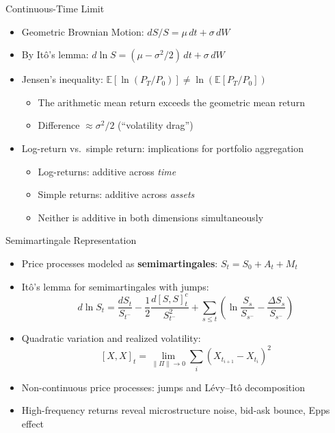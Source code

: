 \documentclass[9pt, aspectratio=169, t]{beamer}
\theoremstyle{definition}
\newcommand{\E}{\mathbb{E}}
\begin{document}
\begin{frame}{Continuous-Time Limit}
\begin{itemize}
\item Geometric Brownian Motion: $dS/S = \mu\,dt + \sigma\,dW$
\item By It\^{o}'s lemma: $d\ln S = (\mu - \sigma^2/2)\,dt + \sigma\,dW$
\item Jensen's inequality: $\E[\ln(P_T/P_0)] \neq \ln(\E[P_T/P_0])$
\begin{itemize}
\item The arithmetic mean return exceeds the geometric mean return
\item Difference $\approx \sigma^2/2$ (``volatility drag'')
\end{itemize}
\item Log-return vs.\ simple return: implications for portfolio aggregation
\begin{itemize}
\item Log-returns: additive across \textit{time}
\item Simple returns: additive across \textit{assets}
\item Neither is additive in both dimensions simultaneously
\end{itemize}
\end{itemize}
\end{frame}

\begin{frame}{Semimartingale Representation}
\begin{itemize}
\item Price processes modeled as \textbf{semimartingales}: $S_t = S_0 + A_t + M_t$
\item It\^{o}'s lemma for semimartingales with jumps:
\[
d\ln S_t = \frac{dS_t}{S_{t^-}} - \frac{1}{2}\frac{d[S,S]_t^c}{S_{t^-}^2} + \sum_{s \leq t}\left(\ln\frac{S_s}{S_{s^-}} - \frac{\Delta S_s}{S_{s^-}}\right)
\]
\item Quadratic variation and realized volatility:
\[
[X,X]_t = \lim_{\|\Pi\| \to 0} \sum_{i} (X_{t_{i+1}} - X_{t_i})^2
\]
\item Non-continuous price processes: jumps and L\'{e}vy--It\^{o} decomposition
\item High-frequency returns reveal microstructure noise, bid-ask bounce, Epps effect
\end{itemize}
\end{frame}

\end{document}
